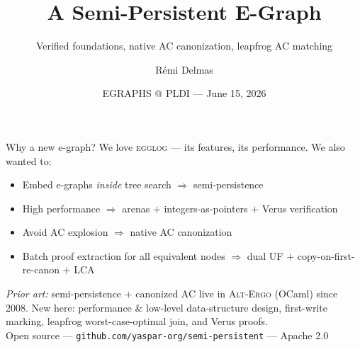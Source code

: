 \documentclass[aspectratio=169,10pt]{beamer}
\title{A Semi-Persistent E-Graph}
\subtitle{Verified foundations, native AC canonization, leapfrog AC matching}
\author{R\'emi Delmas}
\institute{Amazon Web Services --- Automated Reasoning Group}
\date{EGRAPHS @ PLDI --- June 15, 2026}
\begin{document}
\maketitle
{}

\begin{frame}{Why a new e-graph?}
We love \textsc{egglog} --- its features, its performance. We also wanted to:
\begin{itemize}
  \item Embed e-graphs \emph{inside} tree search \hfill$\Rightarrow$ \alert{semi-persistence}
  \item High performance \hfill$\Rightarrow$ \alert{arenas $+$ integers-as-pointers $+$ Verus verification}
  \item Avoid AC explosion \hfill$\Rightarrow$ \alert{native AC canonization}
  \item Batch proof extraction for all equivalent nodes \hfill$\Rightarrow$ \alert{dual UF $+$ copy-on-first-re-canon $+$ LCA}
\end{itemize}
\vfill
\footnotesize \emph{Prior art:} semi-persistence $+$ canonized AC live in \textsc{Alt-Ergo} (OCaml) since 2008. New here: performance \& low-level data-structure design, \alert{first-write} marking, \alert{leapfrog} worst-case-optimal join, and Verus proofs.\\[2mm]
\normalsize Open source --- \texttt{github.com/yaspar-org/semi-persistent} --- Apache 2.0
\end{frame}
\end{document}
